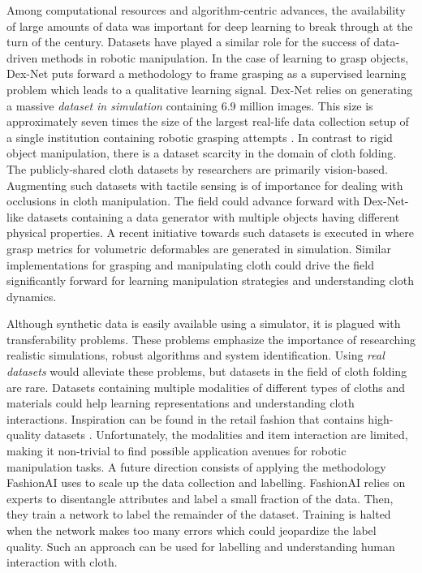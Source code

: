 \documentclass[\home/main.tex]{subfiles}
\begin{document}
Among computational resources and algorithm-centric advances, the availability of large amounts of data was important for deep learning to break through at the turn of the century. Datasets have played a similar role for the success of data-driven methods in robotic manipulation. In the case of learning to grasp objects, Dex-Net \autocite{dexnet2} puts forward a methodology to frame grasping as a supervised learning problem which leads to a qualitative learning signal. Dex-Net relies on generating a massive \emph{dataset in simulation} containing 6.9 million images. This size is approximately seven times the size of the largest real-life data collection setup of a single institution containing robotic grasping attempts \autocite{Levine2016}. In contrast to rigid object manipulation, there is a dataset scarcity in the domain of cloth folding. The publicly-shared cloth datasets by researchers are primarily vision-based. Augmenting such datasets with tactile sensing is of importance for dealing with occlusions in cloth manipulation. The field could advance forward with Dex-Net-like datasets containing a data generator with multiple objects having different physical properties. A recent initiative towards such datasets is executed in \textcite{DefGraspSim} where grasp metrics for volumetric deformables are generated in simulation. Similar implementations for grasping and manipulating cloth could drive the field significantly forward for learning manipulation strategies and understanding cloth dynamics.

Although synthetic data is easily available using a simulator, it is plagued with transferability problems. These problems emphasize the importance of researching realistic simulations, robust algorithms and system identification. Using \emph{real datasets} would alleviate these problems, but datasets in the field of cloth folding are rare. Datasets containing multiple modalities of different types of cloths and materials could help learning representations and understanding cloth interactions. Inspiration can be found in the retail fashion that contains high-quality datasets \autocite{DeepFashion, DeepFashion2, FashionAI}. Unfortunately, the modalities and item interaction are limited, making it non-trivial to find possible application avenues for robotic manipulation tasks. A future direction consists of applying the methodology FashionAI \autocite{FashionAI} uses to scale up the data collection and labelling. FashionAI relies on experts to disentangle attributes and label a small fraction of the data. Then, they train a network to label the remainder of the dataset. Training is halted when the network makes too many errors which could jeopardize the label quality. Such an approach can be used for labelling and understanding human interaction with cloth.
\end{document}
